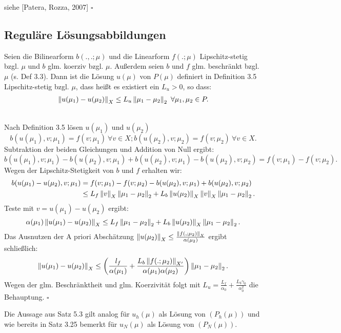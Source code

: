 siehe [Patera, Rozza, 2007]
\hfill $\square$

\subsection{Reguläre Lösungsabbildungen}

Seien die Bilinearform $b(.,.;\mu)$ und die Linearform $f(.;\mu)$ Lipschitz-stetig bzgl. $\mu$ und $b$ glm. koerziv bzgl. $\mu$.
Außerdem seien $b$ und $f$ glm. beschränkt bzgl. $\mu$ (s. Def 3.3).
Dann ist die Lösung $u(\mu)$ von $P(\mu)$ definiert in Definition 3.5 Lipschitz-stetig bzgl. $\mu$, dass heißt es existiert ein $L_u>0$, so dass:
\begin{align}
\left\Vert u(\mu_1)-u(\mu_2)\right\Vert_X \le L_u \left\Vert\mu_1-\mu_2\right\Vert_2~\forall \mu_1,\mu_2\in P.
\end{align}

\\
Nach Definition 3.5 lösen $u(\mu_1)$ und $u(\mu_2)$
\[
b(u(\mu_1),v;\mu_1) = f(v;\mu_1)~\forall v\in X; b(u(\mu_2),v;\mu_2) = f(v;\mu_2)~\forall v\in X.
\]
Subtraktion der beiden Gleichungen und Addition von Null ergibt:
\[
b(u(\mu_1),v;\mu_1) - b(u(\mu_2),v;\mu_1) + b(u(\mu_2),v;\mu_1) -b(u(\mu_2),v;\mu_2) = f(v;\mu_1) -f(v;\mu_2).
\]
Wegen der Lipschitz-Stetigkeit von $b$ und $f$ erhalten wir:
\begin{align*}
b(u(\mu_1)-u(\mu_2),v;\mu_1) &= f(v;\mu_1) -f(v;\mu_2) - b(u(\mu_2),v;\mu_1) +  b(u(\mu_2),v;\mu_2)\\
&\le L_f \left\Vert v\right\Vert_X \left\Vert\mu_1-\mu_2\right\Vert_2 +L_b \left\Vert u(\mu_2)\right\Vert_X \left\Vert v\right\Vert_X \left\Vert\mu_1-\mu_2\right\Vert_2.
\end{align*}
Teste mit $v = u(\mu_1)-u(\mu_2)$ ergibt:
\[
\alpha(\mu_1) \left\Vert u(\mu_1)-u(\mu_2)\right\Vert_X \le L_f \left\Vert\mu_1-\mu_2\right\Vert_2 +L_b \left\Vert u(\mu_2)\right\Vert_X \left\Vert\mu_1-\mu_2\right\Vert_2.
\]
Das Ausnutzen der A priori Abschätzung $\left\Vert u(\mu_2)\right\Vert_X \le \frac{\left\Vert f(,;\mu_2)\right\Vert_X}{\alpha(\mu_2)}$ ergibt schließlich:
\[
\left\Vert u(\mu_1)-u(\mu_2)\right\Vert_X \le \left( \frac{l_f}{\alpha(\mu_1)} + \frac{L_b \left\Vert f(.;\mu_2)\right\Vert_{X'}}{\alpha(\mu_1)\alpha(\mu_2)}\right) \left\Vert\mu_1-\mu_2\right\Vert_2.
\]
Wegen der glm. Beschränktheit und glm. Koerzivität folgt mit $L_u = \frac{L_f}{\alpha_0} + \frac{L_b \gamma_0}{\alpha_0^2}$ die Behauptung.
\hfill $\square$

Die Aussage aus Satz 5.3 gilt analog für $u_h(\mu)$ als Lösung von $(P_h(\mu))$ und wie bereits in Satz 3.25 bemerkt für $u_N(\mu)$ als Lösung von $(P_N(\mu))$.

